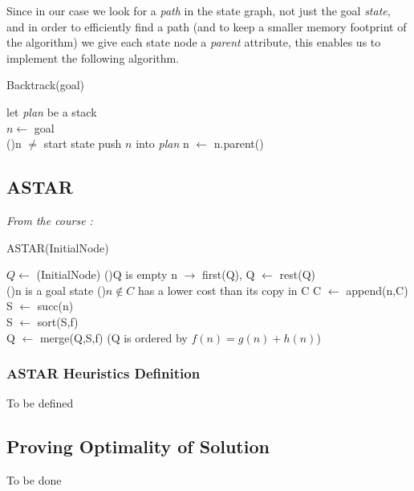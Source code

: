 \documentclass[11pt]{article}
\begin{document}
Since in our case we look for a \emph{path} in the state graph, not just the goal \emph{state}, and in order to efficiently find a path (and to keep a smaller memory footprint of the algorithm) we give each state node a \emph{parent} attribute, this enables us to implement the following algorithm. 

\begin{algorithm}[H]
    \caption{Backtrack(goal)}
    \SetAlgoLined
    let \emph{plan} be a stack \\
    $n \leftarrow$ goal\\
    \Repeat(){n $\neq$ start state}{
        push $n$ into \emph{plan}
        n $\leftarrow$ n.parent()
        }
\end{algorithm}


\subsection{ASTAR}

\emph{From the course : }

\begin{algorithm}[H]
    \caption{ASTAR(InitialNode)}
    \SetAlgoLined
    $Q \leftarrow$ (InitialNode)
    \Repeat(){Q is empty}{
        n $\rightarrow$ first(Q), Q $\leftarrow$ rest(Q) \\
        \If(){n is a goal state}{
        }
        \If(){$n \not \in C$ has a lower cost than its copy in C }{
            C $\leftarrow$ append(n,C)\\
            S $\leftarrow$ succ(n) \\
            S $\leftarrow$ sort(S,f) \\
            Q $\leftarrow$ merge(Q,S,f) (Q is ordered by $f(n) = g(n)+h(n)$)
        }
    }
\end{algorithm}

\subsubsection{ASTAR Heuristics Definition}
To be defined

\subsection{Proving Optimality of Solution}
To be done
\end{document}
